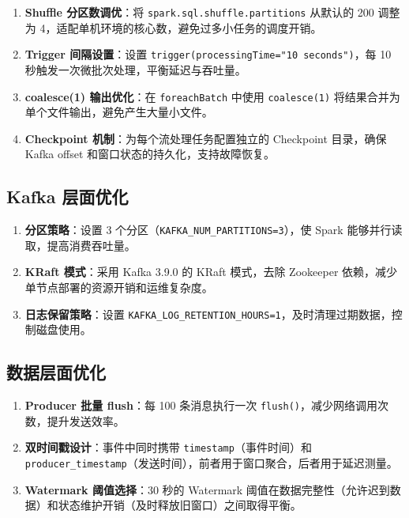 \documentclass[12pt,a4paper]{article}
\begin{document}
\begin{enumerate}    \item \textbf{Shuffle 分区数调优}：将 \texttt{spark.sql.shuffle.partitions} 从默认的 200 调整为 4，适配单机环境的核心数，避免过多小任务的调度开销。

    \item \textbf{Trigger 间隔设置}：设置 \texttt{trigger(processingTime="10 seconds")}，每 10 秒触发一次微批次处理，平衡延迟与吞吐量。

    \item \textbf{coalesce(1) 输出优化}：在 \texttt{foreachBatch} 中使用 \texttt{coalesce(1)} 将结果合并为单个文件输出，避免产生大量小文件。

    \item \textbf{Checkpoint 机制}：为每个流处理任务配置独立的 Checkpoint 目录，确保 Kafka offset 和窗口状态的持久化，支持故障恢复。
\end{enumerate}

\subsection{Kafka 层面优化}

\begin{enumerate}    \item \textbf{分区策略}：设置 3 个分区（\texttt{KAFKA\_NUM\_PARTITIONS=3}），使 Spark 能够并行读取，提高消费吞吐量。

    \item \textbf{KRaft 模式}：采用 Kafka 3.9.0 的 KRaft 模式，去除 Zookeeper 依赖，减少单节点部署的资源开销和运维复杂度。

    \item \textbf{日志保留策略}：设置 \texttt{KAFKA\_LOG\_RETENTION\_HOURS=1}，及时清理过期数据，控制磁盘使用。
\end{enumerate}

\subsection{数据层面优化}

\begin{enumerate}    \item \textbf{Producer 批量 flush}：每 100 条消息执行一次 \texttt{flush()}，减少网络调用次数，提升发送效率。

    \item \textbf{双时间戳设计}：事件中同时携带 \texttt{timestamp}（事件时间）和 \texttt{producer\_timestamp}（发送时间），前者用于窗口聚合，后者用于延迟测量。

    \item \textbf{Watermark 阈值选择}：30 秒的 Watermark 阈值在数据完整性（允许迟到数据）和状态维护开销（及时释放旧窗口）之间取得平衡。
\end{enumerate}
\end{document}
